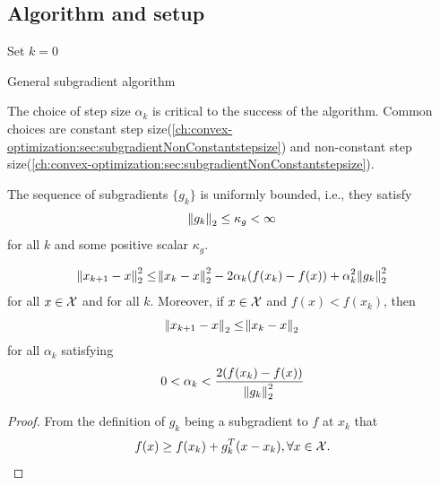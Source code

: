 \begin{refsection}
\subsection{Algorithm and setup}
\begin{algorithm}[H]\label{ch:convex-optimization:alg:generalSubgradientAlgorithm}
	\SetAlgoLined
	Set $k = 0$
	\caption{General subgradient algorithm}
\end{algorithm}

\begin{remark}\hfill
The choice of step size $\alpha_k$ is critical to the success of the algorithm. Common choices are constant step size(\autoref{ch:convex-optimization:sec:subgradientNonConstantstepsize}) and non-constant step size(\autoref{ch:convex-optimization:sec:subgradientNonConstantstepsize}).
\end{remark}


\begin{definition}\label{}
The sequence of subgradients $\{g_k\}$ is uniformly bounded, i.e., they satisfy 
$$\norm{g_k}_2 \leq \kappa_g < \infty$$
for all $k$ and some positive scalar $\kappa_g$.
\end{definition}



\begin{lemma}\label{ch:convex-optimization:th:fundamentalinequalitysubgradientmethod}
$$\norm{x_{k+1} - x}_2^2\leq \norm{x_k - x}_2^2 - 2\alpha_k (f(x_k) - f(x)) + \alpha_k^2 \norm{g_k}_2^2$$
for all $x\in \mathcal{X}$ and for all $k$. Moreover, if $x\in \mathcal{X}$ and $f(x) < f(x_k)$, then
$$\norm{x_{k+1} - x}_2 \leq \norm{x_k - x}_2$$
for all $\alpha_k$ satisfying
$$0< \alpha_k < \frac{2(f(x_k) - f(x))}{\norm{g_k}_2^2}$$ 
\end{lemma}
\begin{proof}
From the definition of $g_k$ being a subgradient to $f$ at $x_k$ that
$$f(x)\geq f(x_k) + g_k^T(x - x_k), \forall x\in \mathcal{X}.$$


\end{proof}
\end{refsection}
